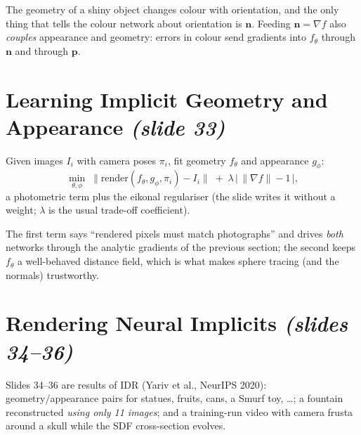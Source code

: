 \documentclass[11pt,a4paper]{article}
\newcommand{\bp}{{\bm{p}}}
\newcommand{\bn}{{\bm{n}}}
\theoremstyle{definition}
\theoremstyle{plain}
\theoremstyle{remark}
\begin{document}

\begin{intuition}
The geometry of a shiny object changes colour with orientation, and the only thing that tells the colour network
about orientation is $\bn$. Feeding $\bn=\nabla f$ also \emph{couples} appearance and geometry: errors in colour send
gradients into $f_\theta$ through $\bn$ and through $\bp$.
\end{intuition}

\section{Learning Implicit Geometry and Appearance \emph{(slide 33)}}
Given images $I_i$ with camera poses $\pi_i$, fit geometry $f_\theta$ and appearance $g_\phi$:
\begin{equation}\label{eq:loss}
\min_{\theta,\phi}\;\bigl\|\mathrm{render}(f_\theta,g_\phi,\pi_i)-I_i\bigr\|\;+\;\lambda\,\bigl|\,\|\nabla f\|-1\,\bigr| ,
\end{equation}
a photometric term plus the eikonal regulariser (the slide writes it without a weight; $\lambda$ is the
usual trade-off coefficient).

\begin{intuition}
The first term says ``rendered pixels must match photographs'' and drives \emph{both} networks through the
analytic gradients of the previous section; the second keeps $f_\theta$ a well-behaved distance field, which is what makes
sphere tracing (and the normals) trustworthy.
\end{intuition}

\section{Rendering Neural Implicits \emph{(slides 34--36)}}
Slides 34--36 are results of IDR (Yariv et al., NeurIPS 2020): geometry/appearance pairs for statues, fruits, cans, a
Smurf toy, \dots{}; a fountain reconstructed \emph{using only 11 images}; and a training-run video with camera frusta
around a skull while the SDF cross-section evolves.
\end{document}

